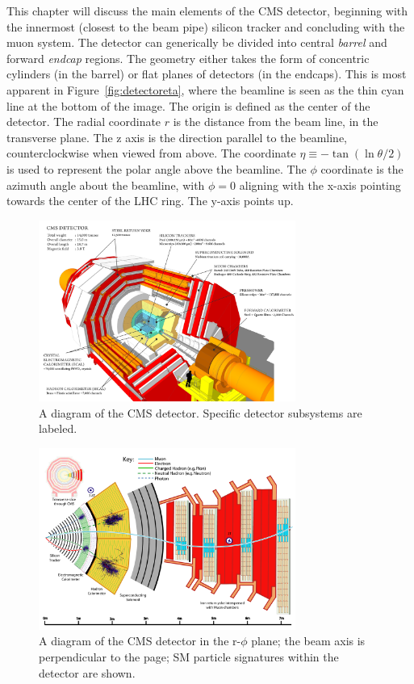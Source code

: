 This chapter will discuss the main elements of the CMS detector, beginning with the innermost (closest to the beam pipe) silicon tracker and concluding with the muon system. The detector can generically be divided into central \textit{barrel} and forward \textit{endcap} regions. The geometry either takes the form of concentric cylinders (in the barrel) or flat planes of detectors (in the endcaps). This is most apparent in Figure~\ref{fig:detectoreta}, where the beamline is seen as the thin cyan line at the bottom of the image. The origin is defined as the center of the detector. The radial coordinate $r$ is the distance from the beam line, in the transverse plane. The z axis is the direction parallel to the beamline, counterclockwise when viewed from above. The coordinate $\eta\equiv- \tan \left( \ln{\theta/2} \right)$ is used to represent the polar angle above the beamline. The $\phi$ coordinate is the azimuth angle about the beamline, with $\phi=0$ aligning with the x-axis pointing towards the center of the LHC ring. The y-axis points up.

\begin{figure}
\centering
\includegraphics[width=0.75\textwidth]{figs/howcmsworks.png}
\caption[A diagram of the CMS detector.]{A diagram of the CMS detector. Specific detector subsystems are labeled.}
\label{fig:howcmsworks}
\end{figure}

\begin{figure}
\centering
\includegraphics[width=0.75\textwidth]{figs/CMS-PRF-14-001_Figure_001.pdf}
\caption[A diagram of the CMS detector in the r-$\phi$ plane; particle signatures are shown.]{A diagram of the CMS detector in the r-$\phi$ plane; the beam axis is perpendicular to the page; SM particle signatures within the detector are shown.}
\label{fig:schematicview}
\end{figure}

